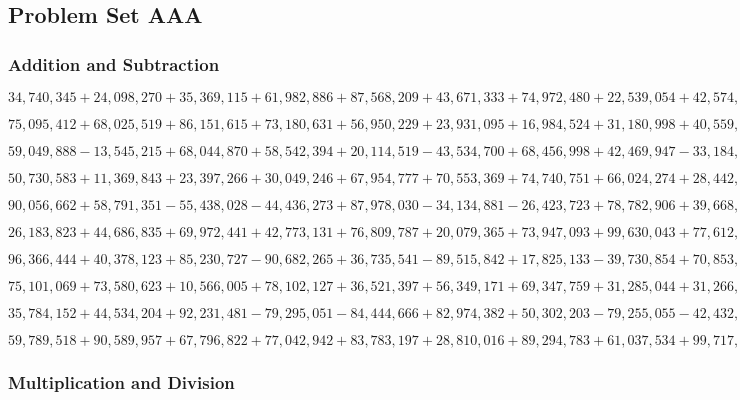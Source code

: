\hypertarget{problem-set-aaa-11}{%
\subsection{Problem Set AAA}\label{problem-set-aaa-11}}

\hypertarget{addition-and-subtraction-367}{%
\subsubsection{Addition and
Subtraction}\label{addition-and-subtraction-367}}

\(34,740,345+24,098,270+35,369,115+61,982,886+87,568,209+43,671,333+74,972,480+22,539,054+42,574,207+88,936,466\)

\(75,095,412+68,025,519+86,151,615+73,180,631+56,950,229+23,931,095+16,984,524+31,180,998+40,559,129+38,793,368\)

\(59,049,888-13,545,215+68,044,870+58,542,394+20,114,519-43,534,700+68,456,998+42,469,947-33,184,419-20,156,846\)

\(50,730,583+11,369,843+23,397,266+30,049,246+67,954,777+70,553,369+74,740,751+66,024,274+28,442,058+93,887,611\)

\(90,056,662+58,791,351-55,438,028-44,436,273+87,978,030-34,134,881-26,423,723+78,782,906+39,668,574+16,238,664\)

\(26,183,823+44,686,835+69,972,441+42,773,131+76,809,787+20,079,365+73,947,093+99,630,043+77,612,318+80,218,326\)

\(96,366,444+40,378,123+85,230,727-90,682,265+36,735,541-89,515,842+17,825,133-39,730,854+70,853,763-82,476,042\)

\(75,101,069+73,580,623+10,566,005+78,102,127+36,521,397+56,349,171+69,347,759+31,285,044+31,266,065+70,770,064\)

\(35,784,152+44,534,204+92,231,481-79,295,051-84,444,666+82,974,382+50,302,203-79,255,055-42,432,578+45,508,242\)

\(59,789,518+90,589,957+67,796,822+77,042,942+83,783,197+28,810,016+89,294,783+61,037,534+99,717,147+46,264,618\)

\hypertarget{multiplication-and-division-366}{%
\subsubsection{Multiplication and
Division}\label{multiplication-and-division-366}}

